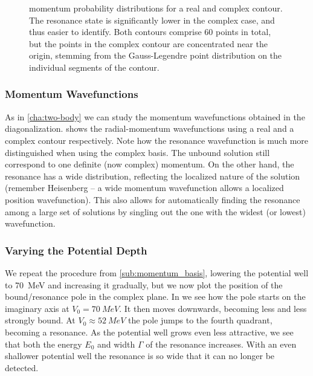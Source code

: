 \documentclass[../main/report.tex]{subfiles}
\begin{document}

\begin{figure}[p!]
\caption{ momentum probability distributions for a real and complex contour. The resonance state is significantly lower in the complex case, and thus easier to identify. Both contours comprise 60 points in total, but the points in the complex contour are concentrated near the origin, stemming from the Gauss-Legendre point distribution on the individual segments of the contour.} 
\label{fig:complex_mom_wavefunctions}
\end{figure}


\subsubsection{Momentum Wavefunctions}

As in \cref{cha:two-body} we can study the momentum wavefunctions obtained in the diagonalization.
 shows the radial-momentum wavefunctions using a real and a complex contour respectively.
Note how the resonance wavefunction is much more distinguished when using the complex basis.  
The unbound solution still correspond to one definite (now complex) momentum. 
On the other hand, the resonance has a wide distribution, reflecting the localized nature of the solution 
(remember Heisenberg -- a wide momentum wavefunction allows a localized position wavefunction). 
This also allows for automatically finding the resonance among a large set of solutions by singling out the one with the widest (or lowest) wavefunction.



\subsubsection{Varying the Potential Depth}
We repeat the procedure from \cref{sub:momentum_basis}, lowering the potential well to \SI{70}{MeV} and increasing it gradually, but we now plot the position of the bound/resonance pole in the complex plane.
In  we see how the pole starts on the imaginary axis at $V_0 = \SI{70}{MeV}$. 
It then moves downwards, becoming less and less strongly bound.
At $V_0 \approx \SI{52}{MeV}$ the pole jumps to the fourth quadrant, becoming a resonance.
As the potential well grows even less attractive, we see that both the energy $E_0$ and width $\Gamma$ of the resonance increases.
With an even shallower potential well the resonance is so wide that it can no longer be detected.
\end{document}
